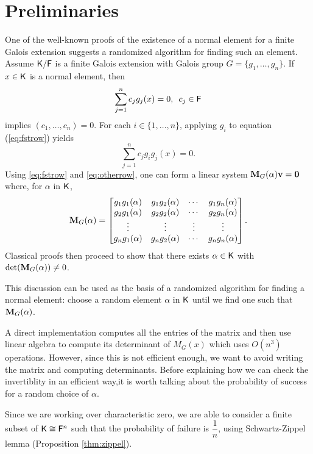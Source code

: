 \section{Preliminaries}
\label{sec:pre}

One of the well-known proofs of the existence of a normal element for
a finite Galois extension \cite[Theorem 6.13.1]{Lang} suggests a
randomized algorithm for finding such an element. Assume ${\mathsf{K}}/{\mathsf{F}}$ is a
finite Galois extension with Galois group $G = \lbrace g_1 , \ldots ,
g_n \rbrace$. If $x \in {\mathsf{K}}$ is a normal element, then
\begin{equation}
  \label{eq:fstrow}
  \sum_{j=1}^n 
  c_j g_j(x)=0, \,\,\, c_j \in {\mathsf{F}} 
\end{equation} 
implies $(c_1, \ldots ,c_n) = 0$. For each $i \in \lbrace 1, \ldots , n\rbrace$, applying $g_i$ to equation (\ref{eq:fstrow}) yields
\begin{equation} \label{eq:otherrow}
 \sum_{j=1}^n 
 c_j g_i g_j(x)=0.
\end{equation}
Using \eqref{eq:fstrow} and \eqref{eq:otherrow}, one can form a linear system $\mat{M}_G(\alpha)\textbf{v} = \textbf{0}$ where,
for $\alpha$ in ${\mathsf{K}}$,
 $$ \mat M_G(\alpha) =
\begin{bmatrix}
g_1 g_1(\alpha) & g_1 g_2(\alpha) & \cdots & g_1 g_n(\alpha) \\
g_2 g_1(\alpha) & g_2 g_2(\alpha) & \cdots & g_2 g_n(\alpha) \\
\vdots		& \vdots	& \vdots & \vdots \\
g_n g_1(\alpha) & g_n g_2(\alpha) & \cdots & g_n g_n(\alpha) \\
\end{bmatrix}. 
$$ Classical proofs then proceed to show that there exists $\alpha \in {\mathsf{K}}$ with
$\det(\mat M_G(\alpha))\neq 0$.
 
This discussion can be used as the basis of a randomized algorithm for
finding a normal element: choose a random element $\alpha$ in ${\mathsf{K}}$
until we find one such that $ \mat M_G(\alpha)$.
 
A direct implementation computes all the entries of the matrix and
then use linear algebra to compute its determinant of $M_G(x)$ which
uses $O(n^3)$ operations. However, since this is not efficient enough,
we want to avoid writing the matrix and computing determinants. Before
explaining how we can check the invertiblity in an efficient way,it is
worth talking about the probability of success for a random choice of
$\alpha$.
 
 Since we are working over characteristic zero, we are able to consider a finite subset
 of ${\mathsf{K}} \cong {\mathsf{F}}^n$ such that the probability of failure is $\dfrac{1}{n}$, using 
 Schwartz-Zippel lemma (Proposition \ref{thm:zippel}).
 
